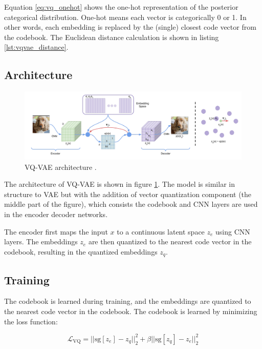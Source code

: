 Equation \ref{eq:vq_onehot} shows the one-hot representation of the posterior categorical distribution. One-hot means each vector is categorically 0 or 1. In other words, each embedding is replaced by the (single) closest code vector from the codebook. The Euclidean distance calculation is shown in listing \ref{lst:vqvae_distance}.


\subsection{Architecture}

\begin{figure}[h]
    \centering
    \includegraphics[width=\textwidth]{images/vqvae_architecture.png}
    \caption{VQ-VAE architecture \cite{vqvae}.}
    \label{fig:vqvae_architecture}
\end{figure}

The architecture of VQ-VAE is shown in figure \ref{fig:vqvae_architecture}. The model is similar in structure to VAE but with the addition of vector quantization component (the middle part of the figure), which consists the codebook and CNN layers are used in the encoder decoder networks.

The encoder first maps the input $x$ to a continuous latent space $z_e$ using CNN layers. The embeddings $z_e$ are then quantized to the nearest code vector in the codebook, resulting in the quantized embeddings $z_q$. 

\subsection{Training}



The codebook is learned during training, and the embeddings are quantized to the nearest code vector in the codebook. The codebook is learned by minimizing the loss function:

\begin{equation}
    \mathcal{L}_{\text{VQ}} = || \text{sg}[z_e] - z_q ||_2^2 + \beta || \text{sg}[z_q] - z_e ||_2^2
\label{eq:vq_loss}
\end{equation}


